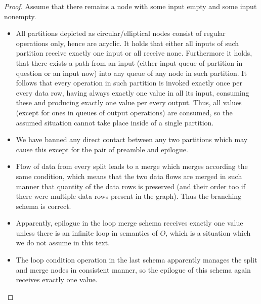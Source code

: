 \begin{observation}
\begin{proof}
        Assume that there remains a node with some input empty and some input nonempty. 
        \begin{itemize}
          \item All partitions depicted as circular/elliptical nodes consist of regular operations only, hence are acyclic. It holds that either all inputs of such partition receive exactly one input or all receive none. Furthermore it holds, that there exists a path from an input (either input queue of partition in question or an input now) into any queue of any node in such partition. It follows that every operation in such partition is invoked exactly once per every data row, having always exactly one value in all its input, consuming these and producing exactly one value per every output. Thus, all values (except for ones in queues of output operations) are consumed, so the assumed situation cannot take place inside of a single partition.  
          \item We have banned any direct contact between any two partitions which may cause this except for the pair of preamble and epilogue.
          \item Flow of data from every split leads to a merge which merges according the same condition, which means that the two data flows are merged in such manner that quantity of the data rows is preserved (and their order too if there were multiple data rows present in the graph). Thus the branching schema is correct.
          \item Apparently, epilogue in the loop merge schema receives exactly one value unless there is an infinite loop in semantics of $O$, which is a situation which we do not assume in this text.
          \item The loop condition operation in the last schema apparently manages the split and merge nodes in consistent manner, so the epilogue of this schema again receives exactly one value.
        \end{itemize}

  \end{proof}
\end{observation}


